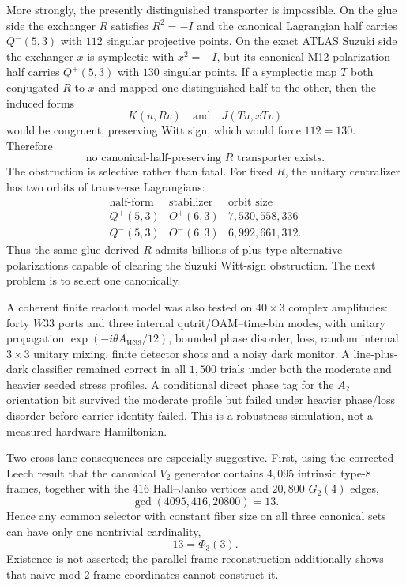 More strongly, the presently distinguished transporter is impossible.  On the
glue side the exchanger $R$ satisfies $R^2=-I$ and the canonical Lagrangian
half carries $Q^-(5,3)$ with $112$ singular projective points.  On the exact
ATLAS Suzuki side the exchanger $x$ is symplectic with $x^2=-I$, but its
canonical M12 polarization half carries $Q^+(5,3)$ with $130$ singular points.
If a symplectic map $T$ both conjugated $R$ to $x$ and mapped one distinguished
half to the other, then the induced forms
\[
K(u,Rv)\quad\text{and}\quad J(Tu,xTv)
\]
would be congruent, preserving Witt sign, which would force $112=130$.
Therefore
\[
\boxed{\text{no canonical-half-preserving }R\text{ transporter exists}.}
\]
The obstruction is selective rather than fatal.  For fixed $R$, the unitary
centralizer has two orbits of transverse Lagrangians:
\[
\begin{array}{c|c|c}
\text{half-form}&\text{stabilizer}&\text{orbit size}\\\hline
Q^+(5,3)&O^+(6,3)&7,530,558,336\\
Q^-(5,3)&O^-(6,3)&6,992,661,312.
\end{array}
\]
Thus the same glue-derived $R$ admits billions of plus-type alternative
polarizations capable of clearing the Suzuki Witt-sign obstruction.  The next
problem is to select one canonically.

A coherent finite readout model was also tested on $40\times3$ complex
amplitudes: forty $W33$ ports and three internal qutrit/OAM--time-bin modes,
with unitary propagation $\exp(-i\theta A_{W33}/12)$, bounded phase disorder,
loss, random internal $3\times3$ unitary mixing, finite detector shots and a
noisy dark monitor.  A line-plus-dark classifier remained correct in all
$1,500$ trials under both the moderate and heavier seeded stress profiles.  A
conditional direct phase tag for the $A_2$ orientation bit survived the
moderate profile but failed under heavier phase/loss disorder before carrier
identity failed.  This is a robustness simulation, not a measured hardware
Hamiltonian.

Two cross-lane consequences are especially suggestive.  First, using the
corrected Leech result that the canonical $V_2$ generator contains $4,095$
intrinsic type-$8$ frames, together with the $416$ Hall--Janko vertices and
$20,800$ $G_2(4)$ edges,
\[
\gcd(4095,416,20800)=13.
\]
Hence any common selector with constant fiber size on all three canonical sets
can have only one nontrivial cardinality,
\[
\boxed{13=\Phi_3(3)}.
\]
Existence is not asserted; the parallel frame reconstruction additionally
shows that naive mod-$2$ frame coordinates cannot construct it.

